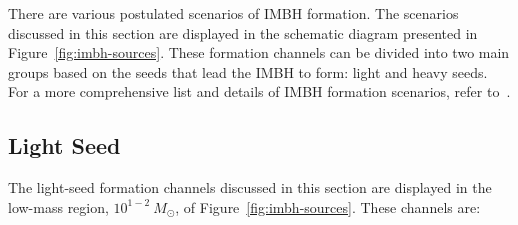 There are various postulated scenarios of IMBH formation. 
The scenarios discussed in this section are displayed in the schematic diagram presented in Figure~\ref{fig:imbh-sources}. 
These formation channels can be divided into two main groups based on the seeds that lead the IMBH to form: light and heavy seeds. 
For a more comprehensive list and details of IMBH formation scenarios, refer to~\cite{van2004intermediate}.





\subsection{Light Seed}

The light-seed formation channels discussed in this section are
displayed in the low-mass region, $10^{1-2} \ M_{\odot}$, of
Figure~\ref{fig:imbh-sources}. These channels are:

